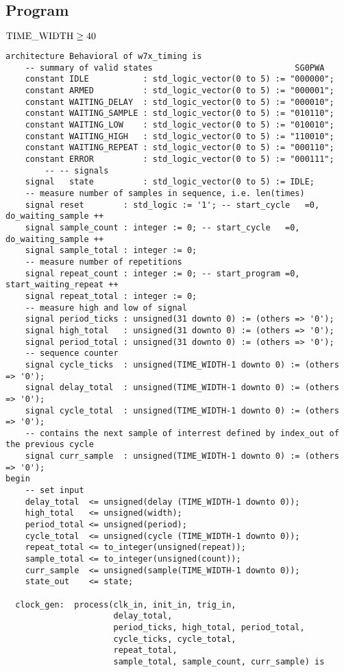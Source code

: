 \documentclass{article}
\begin{document}
\clearpage\thispagestyle{empty}
\subsection*{Program}
$\rm{TIME\_WIDTH} \geq 40$
\begin{lstlisting}
architecture Behavioral of w7x_timing is
    -- summary of valid states                             SG0PWA
    constant IDLE           : std_logic_vector(0 to 5) := "000000";
    constant ARMED          : std_logic_vector(0 to 5) := "000001";
    constant WAITING_DELAY  : std_logic_vector(0 to 5) := "000010";
    constant WAITING_SAMPLE : std_logic_vector(0 to 5) := "010110";
    constant WAITING_LOW    : std_logic_vector(0 to 5) := "010010";
    constant WAITING_HIGH   : std_logic_vector(0 to 5) := "110010";
    constant WAITING_REPEAT : std_logic_vector(0 to 5) := "000110";
    constant ERROR          : std_logic_vector(0 to 5) := "000111";
		-- -- signals
    signal   state          : std_logic_vector(0 to 5) := IDLE;
    -- measure number of samples in sequence, i.e. len(times)
    signal reset        : std_logic := '1'; -- start_cycle   =0, do_waiting_sample ++
    signal sample_count : integer := 0; -- start_cycle   =0, do_waiting_sample ++
    signal sample_total : integer := 0;
    -- measure number of repetitions
    signal repeat_count : integer := 0; -- start_program =0, start_waiting_repeat ++
    signal repeat_total : integer := 0;
    -- measure high and low of signal
    signal period_ticks : unsigned(31 downto 0) := (others => '0');
    signal high_total   : unsigned(31 downto 0) := (others => '0');
    signal period_total : unsigned(31 downto 0) := (others => '0');
    -- sequence counter
    signal cycle_ticks  : unsigned(TIME_WIDTH-1 downto 0) := (others => '0');
    signal delay_total  : unsigned(TIME_WIDTH-1 downto 0) := (others => '0');
    signal cycle_total  : unsigned(TIME_WIDTH-1 downto 0) := (others => '0');
    -- contains the next sample of interrest defined by index_out of the previous cycle
    signal curr_sample  : unsigned(TIME_WIDTH-1 downto 0) := (others => '0');
begin
    -- set input
    delay_total  <= unsigned(delay (TIME_WIDTH-1 downto 0));
    high_total   <= unsigned(width);
    period_total <= unsigned(period);
    cycle_total  <= unsigned(cycle (TIME_WIDTH-1 downto 0));
    repeat_total <= to_integer(unsigned(repeat));
    sample_total <= to_integer(unsigned(count));
    curr_sample  <= unsigned(sample(TIME_WIDTH-1 downto 0));
    state_out    <= state;

  clock_gen:  process(clk_in, init_in, trig_in,
                      delay_total,
                      period_ticks, high_total, period_total,
                      cycle_ticks, cycle_total,
                      repeat_total,
                      sample_total, sample_count, curr_sample) is
  

\end{lstlisting}
\end{document}
